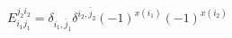 \begin{equation}
E_{i_1j_1}^{j_2i_2}=\delta_{i_1,\bar{j}_1}\delta^{i_2,\bar{j}_2}
(-1)^{x(i_1)}(-1)^{x(i_2)}
\end{equation}

